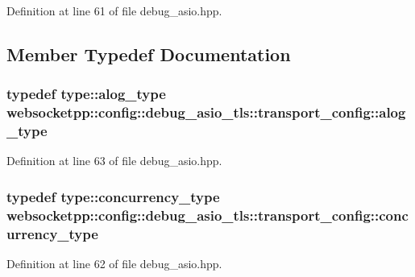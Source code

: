 Definition at line 61 of file debug\+\_\+asio.\+hpp.



\subsection{Member Typedef Documentation}
\hypertarget{structwebsocketpp_1_1config_1_1debug__asio__tls_1_1transport__config_aaec929d2b73d58d487614f632bcd4a0b}{}
\subsubsection[{alog\+\_\+type}]{\setlength{\rightskip}{0pt plus 5cm}typedef {\bf type\+::alog\+\_\+type} {\bf websocketpp\+::config\+::debug\+\_\+asio\+\_\+tls\+::transport\+\_\+config\+::alog\+\_\+type}}\label{structwebsocketpp_1_1config_1_1debug__asio__tls_1_1transport__config_aaec929d2b73d58d487614f632bcd4a0b}


Definition at line 63 of file debug\+\_\+asio.\+hpp.

\hypertarget{structwebsocketpp_1_1config_1_1debug__asio__tls_1_1transport__config_a357e9e1e7c62aee01740a753f2d18698}{}
\subsubsection[{concurrency\+\_\+type}]{\setlength{\rightskip}{0pt plus 5cm}typedef {\bf type\+::concurrency\+\_\+type} {\bf websocketpp\+::config\+::debug\+\_\+asio\+\_\+tls\+::transport\+\_\+config\+::concurrency\+\_\+type}}\label{structwebsocketpp_1_1config_1_1debug__asio__tls_1_1transport__config_a357e9e1e7c62aee01740a753f2d18698}


Definition at line 62 of file debug\+\_\+asio.\+hpp.

